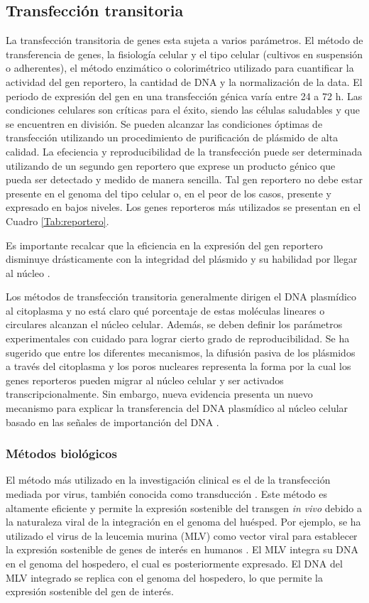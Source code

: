 \documentclass[fleqn,10pt]{SelfArx} %
\begin{document}
\subsection{Transfección transitoria}
La transfección transitoria de genes esta sujeta a varios parámetros. El método de transferencia de genes, la fisiología celular y el tipo celular (cultivos en suspensión o adherentes), el método enzimático o colorimétrico utilizado para cuantificar la actividad del gen reportero, la cantidad de DNA y la normalización de la data. El periodo de expresión del gen en una transfección génica varía entre 24 a 72 h. Las condiciones celulares son críticas para el éxito, siendo las  células saludables y que se encuentren en división. Se pueden alcanzar las condiciones óptimas de transfección utilizando un procedimiento de purificación de plásmido de alta calidad. La efeciencia y reproducibilidad de la transfección puede ser determinada utilizando de un segundo gen reportero que exprese un producto génico que pueda ser detectado y medido de manera sencilla. Tal gen reportero no debe estar presente en el genoma del tipo celular o, en el peor de los casos, presente y expresado en bajos niveles. Los genes reporteros más utilizados se presentan en el Cuadro \ref{Tab:reportero}.

Es importante recalcar que la eficiencia en la expresión del gen reportero disminuye drásticamente con la  integridad del plásmido y su habilidad por llegar al núcleo \cite{Zohar:2001aa}. 

Los métodos de transfección transitoria generalmente dirigen el DNA plasmídico al citoplasma y no está claro qué porcentaje de estas moléculas lineares o circulares alcanzan el núcleo celular. Además, se deben definir los parámetros experimentales con cuidado para lograr cierto grado de reproducibilidad. Se ha sugerido que entre los diferentes mecanismos, la difusión pasiva de los plásmidos a través del citoplasma y los poros nucleares representa la forma por la cual los genes reporteros  pueden migrar al núcleo celular y ser activados transcripcionalmente.  Sin embargo, nueva evidencia presenta un nuevo mecanismo para explicar la transferencia del DNA plasmídico al núcleo celular basado en las señales de importanción del DNA \cite{Vacik:1999aa, Zohar:2001aa}.



\subsubsection{Métodos biológicos}
El método más utilizado en la investigación clinical es el de la transfección mediada por virus, también conocida como transducción \cite{Pfeifer:2001aa}. Este método es altamente eficiente y permite la expresión sostenible del transgen \textit{in vivo} debido a la naturaleza viral de la integración en el genoma del huésped. Por ejemplo, se ha utilizado el virus de la leucemia murina (MLV)  como vector viral para establecer la expresión sostenible de genes de interés en humanos \cite{Hacein-Bey-Abina:2002aa, Roesler:2002aa}. El MLV integra su DNA en el genoma del hospedero, el cual es posteriormente expresado. El DNA del MLV integrado se replica con el genoma del hospedero, lo que permite la expresión sostenible del gen de interés.
\end{document}
